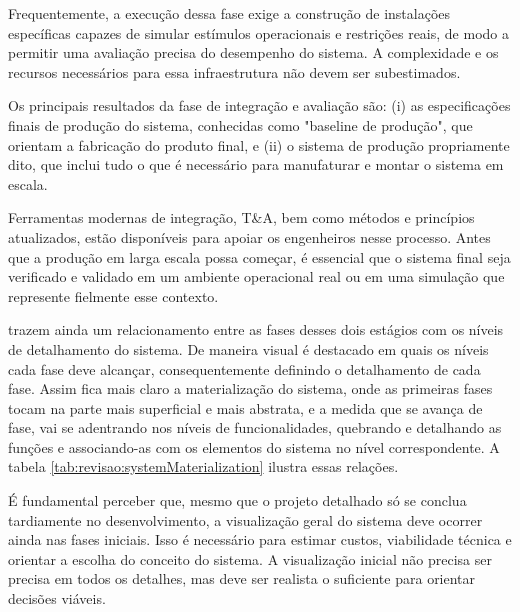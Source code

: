 	Frequentemente, a execução dessa fase exige a construção de instalações específicas capazes de simular estímulos operacionais e restrições reais, de modo a 
	permitir uma avaliação precisa do desempenho do sistema. A complexidade e os recursos necessários para essa infraestrutura não devem ser subestimados.

	Os principais resultados da fase de integração e avaliação são: (i) as especificações finais de produção do sistema, conhecidas como "baseline de produção", 
	que orientam a fabricação do produto final, e (ii) o sistema de produção propriamente dito, que inclui tudo o que é necessário para manufaturar e montar o 
	sistema em escala.

	Ferramentas modernas de integração, T\&A, bem como métodos e princípios atualizados, estão disponíveis para apoiar os engenheiros nesse processo. Antes que a 
	produção em larga escala possa começar, é essencial que o sistema final seja verificado e validado em um ambiente operacional real ou em uma simulação que represente 
	fielmente esse contexto.

	\vspace{1.5 cm}
	
	\cite{kossiakoff2020systems} trazem ainda um relacionamento entre as fases desses dois estágios com os níveis de detalhamento do sistema. De maneira visual é destacado
	em quais os níveis cada fase deve alcançar, consequentemente definindo o detalhamento de cada fase. Assim fica mais claro a materialização do sistema, onde as primeiras fases tocam
	na parte mais superficial e mais abstrata, e a medida que se avança de fase, vai se adentrando nos níveis de funcionalidades, quebrando e detalhando as funções e associando-as com
	os elementos do sistema no nível correspondente. A tabela \ref{tab:revisao:systemMaterialization} ilustra essas relações.


	É fundamental perceber que, mesmo que o projeto detalhado só se conclua tardiamente no
	desenvolvimento, a visualização geral do sistema deve ocorrer ainda nas fases iniciais.
	Isso é necessário para estimar custos, viabilidade técnica e orientar a escolha do conceito do sistema.
	A visualização inicial não precisa ser precisa em todos os detalhes, mas deve ser realista o suficiente
	para orientar decisões viáveis.

